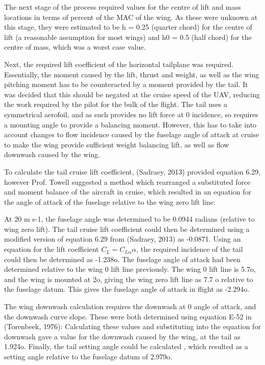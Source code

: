 \documentclass[../../main.tex]{subfiles}
\begin{document}
The next stage of the process required values for the centre of lift and mass locations in terms of percent of the MAC of the wing.
As these were unknown at this stage, they were estimated to be h = 0.25 (quarter chord) for the centre of lift (a reasonable assumption for most wings) and h0 = 0.5 (half chord) for the centre of mass, which was a worst case value. 

Next, the required lift coefficient of the horizontal tailplane was required.
Essentially, the moment caused by the lift, thrust and weight, as well as the wing pitching moment has to be counteracted by a moment provided by the tail.
It was decided that this should be negated at the cruise speed of the UAV, reducing the work required by the pilot for the bulk of the flight.
The tail uses a symmetrical aerofoil, and as such provides no lift force at 0 incidence, so requires a mounting angle to provide a balancing moment.
However, this has to take into account changes to flow incidence caused by the fuselage angle of attack at cruise to make the wing provide sufficient weight balancing lift, as well as flow downwash caused by the wing. 

To calculate the tail cruise lift coefficient, (Sadraey, 2013) provided equation 6.29, however Prof. Towell suggested a method which rearranged a substituted force and moment balance of the aircraft in cruise, which resulted in an equation for the angle of attack of the fuselage relative to the wing zero lift line: 


At 20 m s-1, the fuselage angle was determined to be 0.0944 radians (relative to wing zero lift).
The tail cruise lift coefficient could then be determined using a modified version of equation 6.29 from (Sadraey, 2013) as -0.0871.
Using an equation for the lift coefficient $C_L = C_{L\alpha}\alpha$, the required incidence of the tail could then be determined as -1.238o.
The fuselage angle of attack had been determined relative to the wing 0 lift line previously.
The wing 0 lift line is 5.7o, and the wing is mounted at 2o, giving the wing zero lift line as 7.7 o relative to the fuselage datum.
This gives the fuselage angle of attack in flight as -2.294o.  

The wing downwash calculation requires the downwash at 0 angle of attack, and the downwash curve slope.
These were both determined using equation E-52 in (Torenbeek, 1976): Calculating these values and substituting into the equation for downwash gave a value for the downwash caused by the wing, at the tail as 1.924o.
Finally, the tail setting angle could be calculated , which resulted as a setting angle relative to the fuselage datum of 2.979o. 
\end{document}
